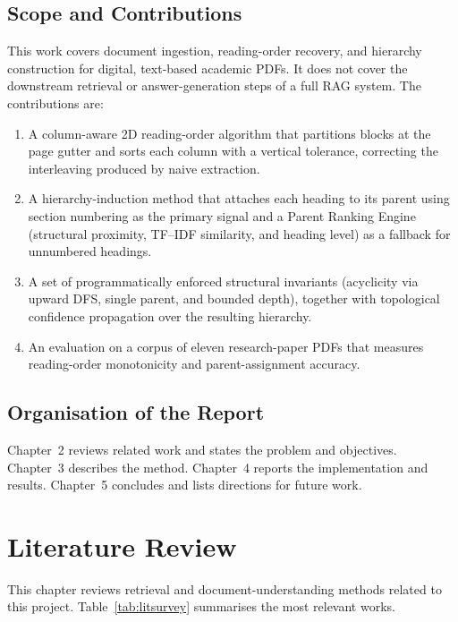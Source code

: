 \documentclass[12pt,a4paper]{report}
\begin{document}
\section{Scope and Contributions}
This work covers document ingestion, reading-order recovery, and hierarchy construction
for digital, text-based academic PDFs. It does not cover the downstream retrieval or
answer-generation steps of a full RAG system. The contributions are:
\begin{enumerate}
  \item A column-aware 2D reading-order algorithm that partitions blocks at the page
  gutter and sorts each column with a vertical tolerance, correcting the interleaving
  produced by naive extraction.
  \item A hierarchy-induction method that attaches each heading to its parent using
  section numbering as the primary signal and a Parent Ranking Engine (structural
  proximity, TF--IDF similarity, and heading level) as a fallback for unnumbered
  headings.
  \item A set of programmatically enforced structural invariants (acyclicity via upward
  DFS, single parent, and bounded depth), together with topological confidence
  propagation over the resulting hierarchy.
  \item An evaluation on a corpus of eleven research-paper PDFs that measures
  reading-order monotonicity and parent-assignment accuracy.
\end{enumerate}

\section{Organisation of the Report}
Chapter~2 reviews related work and states the problem and objectives. Chapter~3
describes the method. Chapter~4 reports the implementation and results. Chapter~5
concludes and lists directions for future work.

\chapter{Literature Review}
This chapter reviews retrieval and document-understanding methods related to this
project. Table~\ref{tab:litsurvey} summarises the most relevant works.
\end{document}
